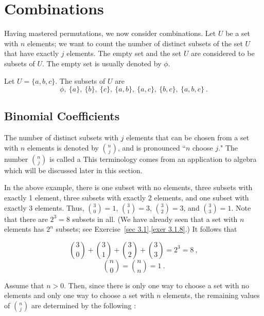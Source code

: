 \section{Combinations}\label{sec 3.2} 

Having mastered permutations, we now consider combinations.  Let $U$ be a set with $n$
elements; we want to count the number of distinct subsets of the set
$U$ that have exactly $j$ elements.  The empty set and the set $U$ are considered to
be subsets of $U$.  The empty set is usually denoted by $\phi$.

\begin{example}\label{exam 3.7} Let $U = \{a,b,c\}$.  The subsets of $U$ are 
$$ \phi,\ \{a\},\ \{b\},\ \{c\},\ \{a,b\},\ \{a,c\},\ \{b,c\},\ \{a,b,c\}\ .$$ 
\end{example}

\subsection*{Binomial Coefficients}

The number of distinct subsets with $j$ elements that can be chosen from a set with
$n$ elements is denoted by ${n \choose j}$, and is pronounced ``$n$ choose $j$."  The
number $n \choose j$  is called a   This
terminology comes from an application to algebra which will be discussed later in this section.

In the above example, there is one subset with no elements, three subsets with exactly
1 element, three subsets with exactly 2 elements, and one subset with exactly 3
elements.  Thus, ${3 \choose 0} = 1$, ${3 \choose 1} = 3$, ${3 \choose 2} = 3$,
 and ${3 \choose 3} = 1$.   Note that there are $2^3 = 8$ subsets in all.  (We have
already seen that a set with $n$  elements has $2^n$ subsets; see Exercise~\ref{sec 3.1}.\ref{exer
3.1.8}.) It follows that

$$ {3 \choose 0} + {3 \choose 1}  + {3 \choose 2} + {3 \choose 3} = 2^3 = 8\ ,
$$
$$ {n \choose 0}  = {n \choose n} = 1\ .  
$$

Assume that $n > 0$.  Then, since there is only one way to choose a set with no
elements and only one way to choose a set with $n$ elements, the remaining values of
$n \choose j$ are determined by the following :


